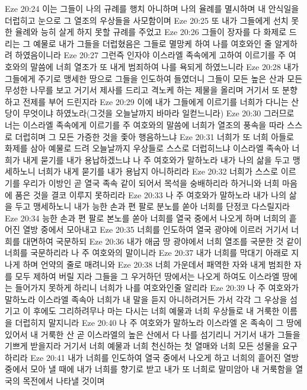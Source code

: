 Eze 20:24  이는 그들이 나의 규례를 행치 아니하며 나의 율례를 멸시하며 내 안식일을 더럽히고 눈으로 그 열조의 우상들을 사모함이며
Eze 20:25  또 내가 그들에게 선치 못한 율례와 능히 살게 하지 못할 규례를 주었고
Eze 20:26  그들이 장자를 다 화제로 드리는 그 예물로 내가 그들을 더럽혔음은 그들로 멸망케 하여 나를 여호와인 줄 알게하려 하였음이니라
Eze 20:27  그런즉 인자야 이스라엘 족속에게 고하여 이르기를 주 여호와의 말씀에 너희 열조가 또 내게 범죄하여 나를 욕되게 하였느니라
Eze 20:28  내가 그들에게 주기로 맹세한 땅으로 그들을 인도하여 들였더니 그들이 모든 높은 산과 모든 무성한 나무를 보고 거기서 제사를 드리고 격노케 하는 제물을 올리며 거기서 또 분향하고 전제를 부어 드린지라
Eze 20:29  이에 내가 그들에게 이르기를 너희가 다니는 산당이 무엇이냐 하였노라(그것을 오늘날까지 바마라 일컫느니라)
Eze 20:30  그러므로 너는 이스라엘 족속에게 이르기를 주 여호와의 말씀에 너희가 열조의 풍속을 따라 스스로 더럽히며 그 모든 가증한 것을 좇아 행음하느냐
Eze 20:31  너희가 또 너희 아들로 화제를 삼아 예물로 드려 오늘날까지 우상들로 스스로 더럽히느냐 이스라엘 족속아 너희가 내게 묻기를 내가 용납하겠느냐 나 주 여호와가 말하노라 내가 나의 삶을 두고 맹세하노니 너희가 내게 묻기를 내가 용납지 아니하리라
Eze 20:32  너희가 스스로 이르기를 우리가 이방인 곧 열국 족속 같이 되어서 목석을 숭배하리라 하거니와 너희 마음에 품은 것을 결코 이루지 못하리라
Eze 20:33  나 주 여호와가 말하노라 내가 나의 삶을 두고 맹세하노니 내가 능한 손과 편 팔로 분노를 쏟아 너희를 단정코 다스릴지라
Eze 20:34  능한 손과 편 팔로 본노를 쏟아 너희를 열국 중에서 나오게 하며 너희의 흩어진 열방 중에서 모아내고
Eze 20:35  너희를 인도하여 열국 광야에 이르러 거기서 너희를 대면하여 국문하되
Eze 20:36  내가 애굽 땅 광야에서 너희 열조를 국문한 것 같이 너희를 국문하리라 나 주 여호와의 말이니라
Eze 20:37  내가 너희를 막대기 아래로 지나게 하며 언약의 줄로 매려니와
Eze 20:38  너희 가운데서 패역한 자와 내게 범죄한 자를 모두 제하여 버릴 지라 그들을 그 우거하던 땅에서는 나오게 하여도 이스라엘 땅에는 들어가지 못하게 하리니 너희가 나를 여호와인줄 알리라
Eze 20:39  나 주 여호와가 말하노라 이스라엘 족속아 너희가 내 말을 듣지 아니하려거든 가서 각각 그 우상을 섬기고 이 후에도 그리하려무나 마는 다시는 너희 예물과 너희 우상들로 내 거룩한 이름을 더럽히지 말지니라
Eze 20:40  나 주 여호와가 말하노라 이스라엘 온 족속이 그 땅에 있어서 내 거룩한 산 곧 이스라엘의 높은 산에서 다 나를 섬기리니 거기서 내가 그들을 기쁘게 받을지라 거기서 너희 예물과 너희 천신하는 첫 열매와 너희 모든 성물을 요구하리라
Eze 20:41  내가 너희를 인도하여 열국 중에서 나오게 하고 너희의 흩어진 열방 중에서 모아 낼 때에 내가 너희를 향기로 받고 내가 또 너희로 말미암아 내 거룩함을 열국의 목전에서 나타낼 것이며

